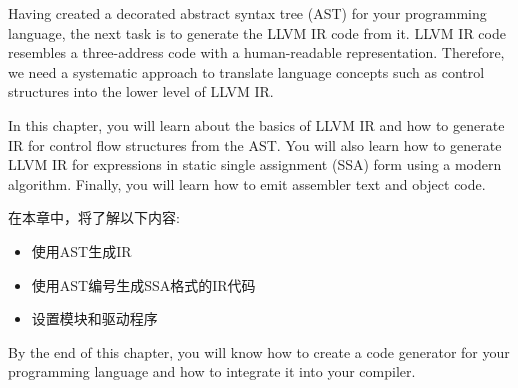 
Having created a decorated abstract syntax tree (AST) for your programming language, the next
task is to generate the LLVM IR code from it. LLVM IR code resembles a three-address code with
a human-readable representation. Therefore, we need a systematic approach to translate language
concepts such as control structures into the lower level of LLVM IR.

In this chapter, you will learn about the basics of LLVM IR and how to generate IR for control flow
structures from the AST. You will also learn how to generate LLVM IR for expressions in static single assignment (SSA) form using a modern algorithm. Finally, you will learn how to emit assembler text and object code.

在本章中，将了解以下内容:

\begin{itemize}
\item
使用AST生成IR

\item
使用AST编号生成SSA格式的IR代码

\item
设置模块和驱动程序
\end{itemize}

By the end of this chapter, you will know how to create a code generator for your programming
language and how to integrate it into your compiler.

